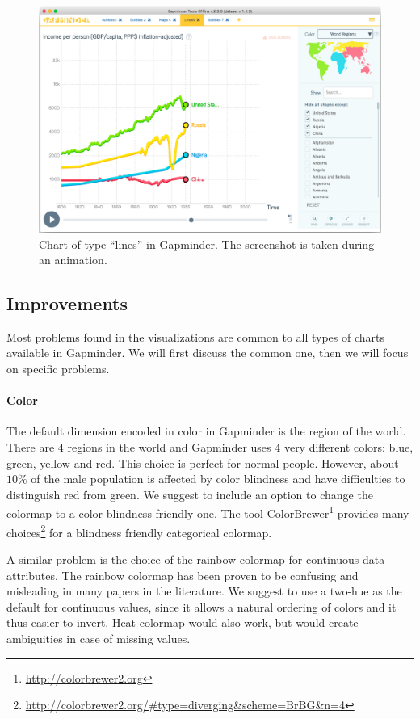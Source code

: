 \begin{figure}[h]
	\centering
	\includegraphics[width=0.95\columnwidth]{figures/lines-animation}
	\caption{Chart of type ``lines'' in Gapminder. The screenshot is taken during an animation.}
	\label{fig:lines-animation}
\end{figure}


\subsection{Improvements}
Most problems found in the visualizations are common to all types of charts available in Gapminder.
We will first discuss the common one, then we will focus on specific problems.

\paragraph{Color}
The default dimension encoded in color in Gapminder is the region of the world.
There are $4$ regions in the world and Gapminder uses $4$ very different colors: blue, green, yellow and red.
This choice is perfect for normal people.
However, about $10\%$ of the male population is affected by color blindness \cite{color-maps} and have difficulties to distinguish red from green.
We suggest to include an option to change the colormap to a color blindness friendly one.
The tool ColorBrewer\footnote{\url{http://colorbrewer2.org}} provides many choices\footnote{\url{http://colorbrewer2.org/#type=diverging&scheme=BrBG&n=4}} for a blindness friendly categorical colormap.

A similar problem is the choice of the rainbow colormap for continuous data attributes.
The rainbow colormap has been proven to be confusing and misleading \cite{color-maps} in many papers in the literature.
We suggest to use a two-hue as the default for continuous values, since it allows a natural ordering of colors and it thus easier to invert.
Heat colormap would also work, but would create ambiguities in case of missing values.

